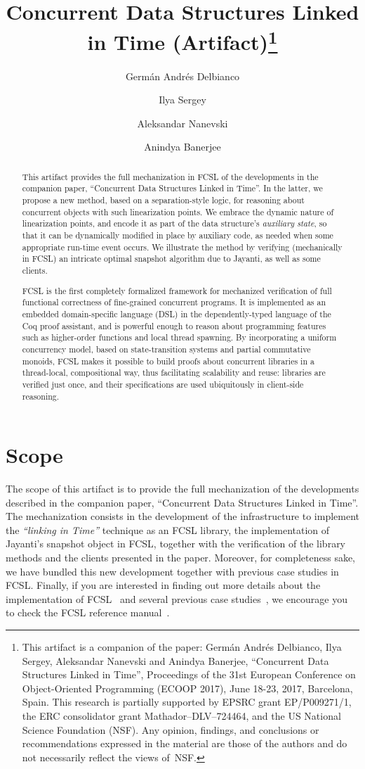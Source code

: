 \documentclass[a4paper,USenglish]{darts}
\title{Concurrent Data Structures Linked in Time
  (Artifact)\footnote{This artifact is a companion of the paper:
    Germ\'{a}n Andr\'{e}s Delbianco, Ilya Sergey, Aleksandar Nanevski
    and Anindya Banerjee, ``Concurrent Data Structures Linked in
    Time'', Proceedings of the 31st European Conference on
    Object-Oriented Programming (ECOOP 2017), June 18-23, 2017,
    Barcelona, Spain. This research is partially supported by EPSRC
    grant EP/P009271/1, the ERC consolidator grant
    Mathador--DLV--724464, and the US National Science Foundation
    (NSF). Any opinion, findings, and conclusions or recommendations
    expressed in the material are those of the authors and do not
    necessarily reflect the views of~NSF.}}
\author[1,2]{Germ\'{a}n Andr\'{e}s Delbianco}
\author[3]{Ilya Sergey}
\author[1]{Aleksandar Nanevski}
\author[1]{Anindya Banerjee}
\affil[1]{IMDEA Software Institute, Madrid, Spain\\
  {\texttt{\{german.delbianco,
      aleks.nanevski,anindya.banerjee\}@imdea.org}}}
\affil[2]{Universidad Polit\'{e}cnica de Madrid, Spain}
\affil[3]{University College London, United Kingdom\\
  {\texttt{i.sergey@ucl.ac.uk}}}
\newenvironment{scope}{\section{Scope}}{}
\begin{document}
\maketitle

\begin{abstract}
This artifact provides the full mechanization in FCSL of the
developments in the companion paper, ``Concurrent Data Structures
Linked in Time''. In the latter, we propose a new method, based on a
separation-style logic, for reasoning about concurrent objects with
such linearization points. We embrace the dynamic nature of
linearization points, and encode it as part of the data structure's
\emph{auxiliary state}, so that it can be dynamically modified in
place by auxiliary code, as needed when some appropriate run-time
event occurs. We illustrate the method by verifying (mechanically in
FCSL) an intricate optimal snapshot algorithm due to Jayanti, as well
as some clients.

FCSL is the first completely formalized framework for mechanized
verification of full functional correctness of fine-grained concurrent
programs. It is implemented as an embedded domain-specific language
(DSL) in the dependently-typed language of the Coq proof assistant,
and is powerful enough to reason about programming features such as
higher-order functions and local thread spawning. By incorporating a
uniform concurrency model, based on state-transition systems and
partial commutative monoids, FCSL makes it possible to build proofs
about concurrent libraries in a thread-local, compositional way, thus
facilitating scalability and reuse: libraries are verified just once,
and their specifications are used ubiquitously in client-side
reasoning.
\end{abstract}


\begin{scope}
  The scope of this artifact is to provide the full mechanization of
  the developments described in the companion paper, ``Concurrent Data
  Structures Linked in Time''. The mechanization consists in the
  development of the infrastructure to implement the \emph{``linking
    in Time''} technique as an FCSL library, the implementation of
  Jayanti's snapshot object in FCSL, together with the verification of
  the library methods and the clients presented in the
  paper. Moreover, for completeness sake, we have bundled this new
  development together with previous case studies in FCSL. Finally, if
  you are interested in finding out more details about the
  implementation of FCSL~\cite{NanevskiLSD+esop14, FCSL:Project} and
  several previous case
  studies~\cite{SergeyNB+ESOP15,SergeyNB+PLDI15,SergeyNBD+OOPSLA16},
  we encourage you to check the FCSL reference
  manual~\cite{FCSL:Manual}.

\end{scope}
\end{document}
